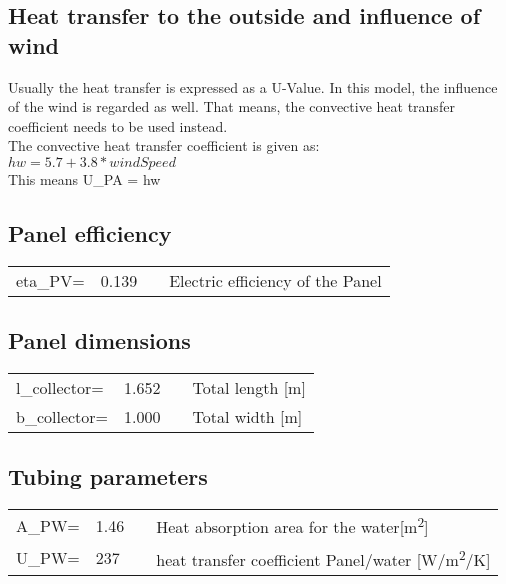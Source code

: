 \subsection{Heat transfer to the outside and influence of wind}
Usually the heat transfer is expressed as a U-Value. In this model, the influence of the wind is regarded as well. That means, the convective heat transfer coefficient needs to be used instead.\\
The convective heat transfer coefficient is given as:\\
$ hw = 5.7 + 3.8*windSpeed  $ \cite{doi:10.1093/ijlct/2.4.359}\\
This means U_PA = hw


\subsection{Panel efficiency}
\begin{tabular}{ l l |c| l}
	eta_PV=	&0.139	&\cite{AnafH-NRG}	&Electric efficiency of the Panel
\end{tabular}


\subsection{Panel dimensions}
\begin{tabular}{ l l |c| l}
	l_collector=	&1.652	&\cite{AnafH-NRG}	&Total length [m]\\
	b_collector=	&1.000	&\cite{AnafH-NRG}	&Total width [m]\\
\end{tabular}


\subsection{Tubing parameters}
\begin{tabular}{ l l |c| l}
	A_PW=	&1.46	&\cite{AnafH-NRG}	       &Heat absorption area for the water[\si{\meter\squared}]\\
	U_PW= 	&237    & \cite{TEngToolB}         &heat transfer coefficient Panel/water [\si[per-mode=symbol]{\watt\per\square\meter\per\kelvin}]\\
\end{tabular}


